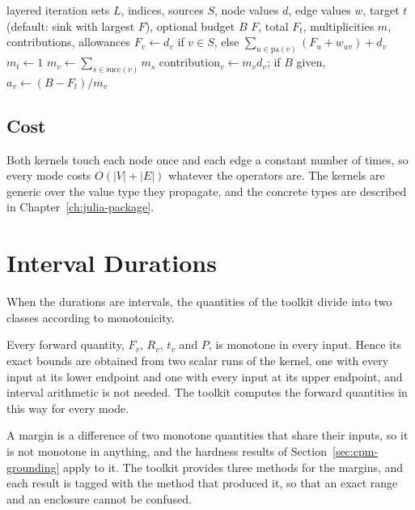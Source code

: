 \documentclass[12pt]{report}
\begin{document}
\begin{algorithm}[htbp]
\caption{Linear kernel (accumulation mode)}
\label{alg:cpm-linear}
\begin{algorithmic}[1]
\Require layered iteration sets $L$, indices, sources $S$, node values $d$, edge values
  $w$, target $t$ (default: sink with largest $F$), optional budget $B$
\Ensure $F$, total $F_t$, multiplicities $m$, contributions, allowances
  \State $F_v \gets d_v$ if $v \in S$, else $\sum_{u \in \mathrm{pa}(v)} (F_u + w_{uv}) + d_v$
\EndFor
\State $m_t \gets 1$
  \State $m_v \gets \sum_{s \in \mathrm{succ}(v)} m_s$
\EndFor
{}
  \State contribution$_v \gets m_v d_v$; \quad if $B$ given, $a_v \gets (B - F_t)/m_v$
\EndFor
\end{algorithmic}
\end{algorithm}

\subsection{Cost}

Both kernels touch each node once and each edge a constant number of times, so every mode
costs $O(|V|+|E|)$ whatever the operators are. The kernels are generic over the value type
they propagate, and the concrete types are described in Chapter~\ref{ch:julia-package}.

\section{Interval Durations}
\label{sec:cpm-interval}

When the durations are intervals, the quantities of the toolkit divide into two classes
according to monotonicity.

Every forward quantity, $F_v$, $R_v$, $t_v$ and $P$, is monotone in every input. Hence its
exact bounds are obtained from two scalar runs of the kernel, one with every input at its
lower endpoint and one with every input at its upper endpoint, and interval arithmetic is
not needed. The toolkit computes the forward quantities in this way for every mode.

A margin is a difference of two monotone quantities that share their inputs, so it is not
monotone in anything, and the hardness results of Section~\ref{sec:cpm-grounding} apply
to it. The toolkit provides three methods for the margins, and each result is tagged with
the method that produced it, so that an exact range and an enclosure cannot be confused.
\end{document}
